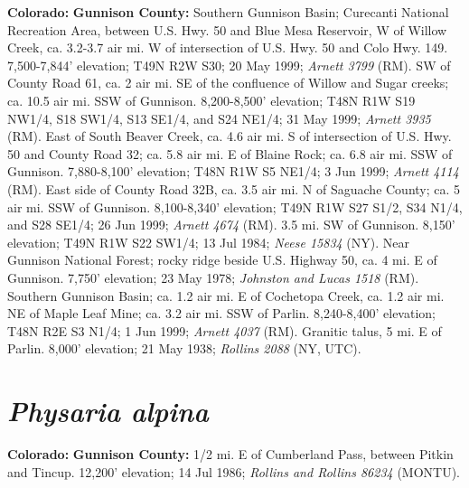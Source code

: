   \textbf{Colorado:}
  \textbf{Gunnison County:}
Southern Gunnison Basin; Curecanti National Recreation Area, between U.S. Hwy.
50 and Blue Mesa Reservoir, W of Willow Creek, ca. 3.2-3.7 air mi. W of
intersection of U.S. Hwy. 50 and Colo Hwy. 149. 7,500-7,844' elevation;
T49N R2W S30; 20 May 1999; \textit{Arnett 3799} (RM).
SW of County Road 61, ca. 2 air mi. SE of the confluence of Willow and Sugar
creeks; ca. 10.5 air mi. SSW of Gunnison. 8,200-8,500' elevation;
T48N R1W S19 NW1/4, S18 SW1/4, S13  SE1/4, and S24 NE1/4; 31 May 1999;
\textit{Arnett 3935} (RM).
East of South Beaver Creek, ca. 4.6 air mi. S of intersection of U.S. Hwy. 50
and County Road 32; ca. 5.8 air mi. E of Blaine Rock; ca. 6.8 air mi. SSW of
Gunnison. 7,880-8,100' elevation; T48N R1W S5 NE1/4; 3 Jun 1999;
\textit{Arnett 4114} (RM).
East side of County Road 32B, ca. 3.5 air mi. N of Saguache County; ca. 5 air
mi. SSW of Gunnison. 8,100-8,340' elevation; T49N R1W S27 S1/2, S34 N1/4, and
S28 SE1/4; 26 Jun 1999; \textit{Arnett 4674} (RM).
3.5 mi. SW of Gunnison. 8,150' elevation; T49N R1W S22 SW1/4; 13 Jul 1984;
\textit{Neese 15834} (NY).
Near Gunnison National Forest; rocky ridge beside U.S. Highway 50,
ca. 4 mi. E of Gunnison. 7,750' elevation; 23 May 1978;
\textit{Johnston and Lucas 1518} (RM).
Southern Gunnison Basin; ca. 1.2 air mi. E of Cochetopa Creek, ca. 1.2 air mi.
NE of Maple Leaf Mine; ca. 3.2 air mi. SSW of Parlin. 8,240-8,400' elevation;
T48N R2E S3 N1/4; 1 Jun 1999; \textit{Arnett 4037} (RM).
Granitic talus, 5 mi. E of Parlin. 8,000' elevation; 21 May 1938;
\textit{Rollins 2088} (NY, UTC).

\section*{\textit{Physaria alpina}}

  \textbf{Colorado:}
  \textbf{Gunnison County:}
1/2 mi. E of Cumberland Pass, between Pitkin and Tincup. 12,200' elevation;
14 Jul 1986; \textit{Rollins and Rollins 86234} (MONTU).

